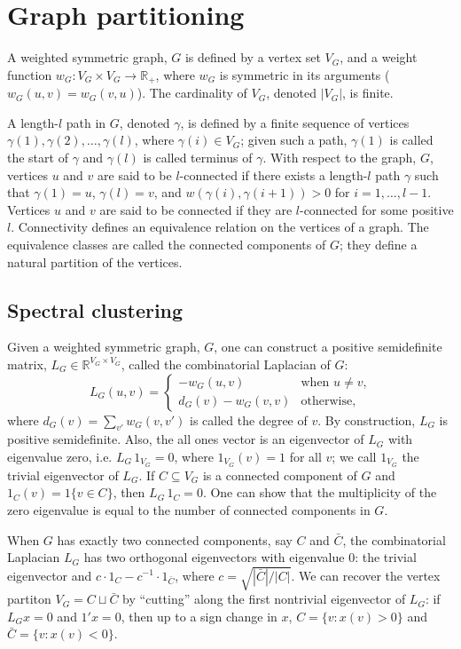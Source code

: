 \documentclass[12pt]{article}
\newcommand{\reals}{\mathbb{R}}
\theoremstyle{plain}
\begin{document}
\section{Graph partitioning}
\label{S:introduction}

A weighted symmetric graph, $G$ is defined by a vertex set $V_G$, and a
weight function $w_G : V_G \times V_G \to \reals_+$, where $w_G$ is symmetric
in its arguments ($w_G(u,v) = w_G(v,u)$).  The cardinality of $V_G$,
denoted $|V_G|$, is finite.

A length-$l$ path in $G$, denoted $\gamma$, is defined by a finite sequence of
vertices $\gamma(1), \gamma(2), \ldots, \gamma(l)$, where $\gamma(i) \in V_G$; given
such a path, $\gamma(1)$ is called the start of $\gamma$ and 
$\gamma(l)$ is called terminus of $\gamma$.  With respect to
the graph, $G$, vertices $u$ and $v$ are said to be $l$-connected if there
exists a length-$l$ path $\gamma$ such that $\gamma(1) = u$,
$\gamma(l) = v$, and $w(\gamma(i), \gamma(i+1)) > 0$ for $i = 1,
\ldots, l-1$.  Vertices $u$ and $v$ are said to be connected if they
are $l$-connected for some positive $l$.  Connectivity defines an
equivalence relation on the vertices of a graph.  The equivalence
classes are called the connected components of $G$; they define a
natural partition of the vertices.

\subsection{Spectral clustering}

Given a weighted symmetric graph, $G$, one can construct a positive
semidefinite matrix, $L_G \in \reals^{V_G \times V_G}$, called the combinatorial Laplacian of $G$:
\[
  L_G(u,v)
  =
  \begin{cases}
    - w_G(u,v) & \text{when $u \neq v$,} \\
    d_G(v) - w_G(v,v) & \text{otherwise,}
  \end{cases}
\]
where $d_G(v) = \sum_{v'} w_G(v,v')$ is called the degree of $v$.
By construction, $L_G$ is positive semidefinite.  Also, the all ones
vector is an eigenvector of $L_G$ with eigenvalue zero, i.e. $L_G \, 1_{V_G}
= 0$, where $1_{V_G}(v) = 1$ for all $v$; we call $1_{V_G}$ the
trivial eigenvector of $L_G$.  If $C \subseteq V_G$ is a connected component of
$G$ and $1_C(v) = 1\{ v \in C \}$, then $L_G \, 1_C = 0$.  One can
show that the multiplicity of the zero eigenvalue is equal to the
number of connected components in $G$.

When $G$ has exactly two connected components, say $C$ and $\bar C$,
the combinatorial Laplacian $L_G$ has two orthogonal eigenvectors
with eigenvalue $0$: the trivial eigenvector and
$c \cdot 1_C - c^{-1} \cdot 1_{\bar C}$, where
$c = \sqrt{|\bar C| / |C|}$.  We can recover the vertex partiton
$V_G = C \sqcup \bar C$ by ``cutting'' along the first nontrivial
eigenvector of $L_G$: if $L_G x = 0$ and $1' x = 0$, then up to a sign
change in $x$, $C = \{ v : x(v) > 0 \}$ and
$\bar C = \{ v : x(v) < 0 \}$.
\end{document}
